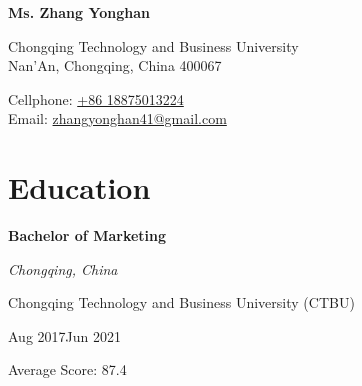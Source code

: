 \documentclass[a4paper,20pt]{article}
\begin{document}

\begin{center}
	\textbf{{\LARGE \color{black} Ms. Zhang Yonghan}}
\end{center}

	\begin{minipage}{.45\linewidth} 
		\begin{flushleft} 
    Chongqing Technology and Business University \\
    Nan'An, Chongqing, China  400067 
    		\end{flushleft} 
    	\end{minipage}
    \hfill 
    \begin{minipage}{.50\linewidth}
    		\begin{flushright}
    Cellphone: \href{} {+86 18875013224} \\
    Email: \href{} {zhangyonghan41@gmail.com} \\
    		\end{flushright}
    	\end{minipage}



\section{Education}

\begin{minipage}{.75\linewidth} \begin{flushleft}
\textbf{Bachelor of Marketing}
\end{flushleft} \end{minipage}
    \hfill 
    \begin{minipage}{.20\linewidth}\begin{flushright}
    	 \textit{Chongqing, China}
    	\end{flushright}\end{minipage}
    	\begin{minipage}{.75\linewidth} \begin{flushleft}
    Chongqing Technology and Business University (CTBU) \\
    	\end{flushleft} \end{minipage}
     \hfill
        \begin{minipage}{.20\linewidth}\begin{flushright}
        	 Aug 2017\textemdash Jun 2021
        	\end{flushright}\end{minipage}
        \begin{minipage}{.75\linewidth} \begin{flushleft}
    	    Average Score: 87.4 \\
    	\end{flushleft} 
     \end{minipage}
\end{document}
